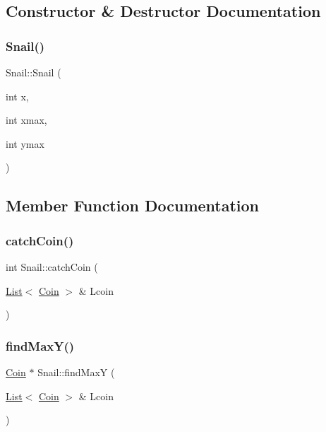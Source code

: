 \subsection{Constructor \& Destructor Documentation}
\mbox{\label{class_snail_ad780249a02a8d7a850ccb7255a0cdf14}} 
\subsubsection{\texorpdfstring{Snail()}{Snail()}}
{\footnotesize\ttfamily Snail\+::\+Snail (\begin{DoxyParamCaption}\item[{int}]{x,  }\item[{int}]{xmax,  }\item[{int}]{ymax }\end{DoxyParamCaption})}



\subsection{Member Function Documentation}
\mbox{\label{class_snail_a2a9deee0c65a5d30f92efd054c6d4155}} 
\subsubsection{\texorpdfstring{catch\+Coin()}{catchCoin()}}
{\footnotesize\ttfamily int Snail\+::catch\+Coin (\begin{DoxyParamCaption}\item[{\mbox{\hyperlink{class_list}{List}}$<$ \mbox{\hyperlink{class_coin}{Coin}} $>$ \&}]{Lcoin }\end{DoxyParamCaption})}

\mbox{\label{class_snail_a1dd9e6d2229dfc452f0163948c7f1980}} 
\subsubsection{\texorpdfstring{find\+Max\+Y()}{findMaxY()}}
{\footnotesize\ttfamily \mbox{\hyperlink{class_coin}{Coin}} $\ast$ Snail\+::find\+MaxY (\begin{DoxyParamCaption}\item[{\mbox{\hyperlink{class_list}{List}}$<$ \mbox{\hyperlink{class_coin}{Coin}} $>$ \&}]{Lcoin }\end{DoxyParamCaption})}

